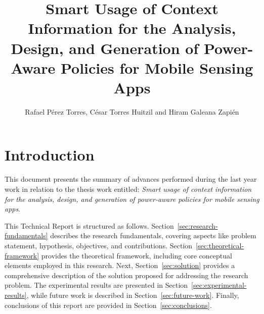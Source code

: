 \documentclass[ENG,PhD]{cinvestav}
\title{Smart Usage of Context Information for the Analysis, Design, and Generation of Power-Aware Policies for Mobile Sensing Apps}
\author{Rafael Pérez Torres, César Torres Huitzil and Hiram Galeana Zapién}
\begin{document}
\makeintropages

\renewcommand{\baselinestretch}{1.2}

%                                                                                              
\section{Introduction}
This document presents the summary of advances performed during the last year work in relation to the thesis work entitled: \emph{Smart usage of context information for the analysis, design, and generation of power-aware policies for mobile sensing apps}.

This Technical Report is structured as follows.
Section~\ref{sec:research-fundamentals} describes the research fundamentals, covering aspects like problem statement, hypothesis, objectives, and contributions.
Section~\ref{sec:theoretical-framework} provides the theoretical framework, including core conceptual elements employed in this research.
Next, Section~\ref{sec:solution} provides a comprehensive description of the solution proposed for addressing the research problem.
The experimental results are presented in Section~\ref{sec:experimental-results}, while future work is described in Section~\ref{sec:future-work}.
Finally, conclusions of this report are provided in Section~\ref{sec:conclusions}.
\end{document}
